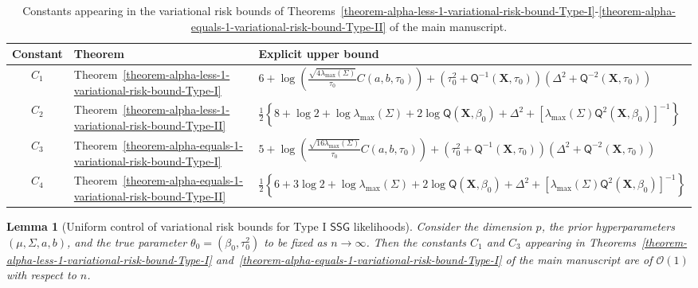 \documentclass[12pt]{article}
\newtheorem{lemma}{Lemma}[section]
\numberwithin{equation}{section}
\newcommand{\ssg}{\mathsf{SSG}}
\begin{document}
\begin{table}[H]
\centering
\caption{\footnotesize{Constants appearing in the variational risk bounds of Theorems~\ref{theorem-alpha-less-1-variational-risk-bound-Type-I}-\ref{theorem-alpha-equals-1-variational-risk-bound-Type-II} of the main manuscript.}}
\label{tab:risk-bound-constants}
\footnotesize
\renewcommand{\arraystretch}{1.6}
\begin{tabular}{@{}c p{} p{}@{}}
\toprule
\toprule
Constant & Theorem & Explicit upper bound \\
\midrule

$C_1$
&
Theorem~\ref{theorem-alpha-less-1-variational-risk-bound-Type-I}
&
$
6+
\log\left(
\frac{\sqrt{4\lambda_{\max}(\Sigma)}}{\tau_0}
C(a,b,\tau_0)
\right)
+
\left(
\tau_0^2+\mathsf{Q}^{-1}(\mathbf{X},\tau_0)
\right)
\left(
\Delta^2+\mathsf{Q}^{-2}(\mathbf{X},\tau_0)
\right)
$
\\

$C_2$
&
Theorem~\ref{theorem-alpha-less-1-variational-risk-bound-Type-II}
&
$
\frac{1}{2}\left\{
8+\log 2+\log\lambda_{\max}(\Sigma)
+2\log\mathsf{Q}(\mathbf{X},\beta_0)
+\Delta^2
+
\left[
\lambda_{\max}(\Sigma)
\mathsf{Q}^2(\mathbf{X},\beta_0)
\right]^{-1}
\right\}
$
\\

$C_3$
&
Theorem~\ref{theorem-alpha-equals-1-variational-risk-bound-Type-I}
&
$
5+
\log\left(
\frac{\sqrt{16\lambda_{\max}(\Sigma)}}{\tau_0}
C(a,b,\tau_0)
\right)
+
\left(
\tau_0^2+\mathsf{Q}^{-1}(\mathbf{X},\tau_0)
\right)
\left(
\Delta^2+\mathsf{Q}^{-2}(\mathbf{X},\tau_0)
\right)
$
\\

$C_4$
&
Theorem~\ref{theorem-alpha-equals-1-variational-risk-bound-Type-II}
&
$
\frac{1}{2}\left\{
6+3\log 2+\log\lambda_{\max}(\Sigma)
+2\log\mathsf{Q}(\mathbf{X},\beta_0)
+\Delta^2
+
\left[
\lambda_{\max}(\Sigma)
\mathsf{Q}^2(\mathbf{X},\beta_0)
\right]^{-1}
\right\}
$
\\

\bottomrule
\bottomrule
\end{tabular}
\end{table}

\begin{lemma}[Uniform control of variational risk bounds for Type I $\ssg$ likelihoods]
\label{lemma:control-C1-C3}
Consider the dimension $p$, the prior hyperparameters $(\mu, \Sigma, a, b)$, and the true parameter $\theta_0 = (\beta_0, \tau_0^{2})$ to be fixed as $n\to \infty$. Then the constants $C_1$ and $C_3$ appearing in Theorems~\ref{theorem-alpha-less-1-variational-risk-bound-Type-I} and~\ref{theorem-alpha-equals-1-variational-risk-bound-Type-I} of the main manuscript are of $\mathcal{O}(1)$ with respect to $n$.
\end{lemma}
\end{document}

